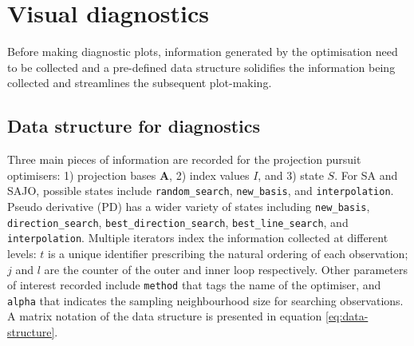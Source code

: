 \hypertarget{vis-diag}{%
\section{Visual diagnostics}\label{vis-diag}}

Before making diagnostic plots, information generated by the
optimisation need to be collected and a pre-defined data structure
solidifies the information being collected and streamlines the
subsequent plot-making.

\hypertarget{data-structure-for-diagnostics}{%
\subsection{Data structure for
diagnostics}\label{data-structure-for-diagnostics}}

Three main pieces of information are recorded for the projection pursuit
optimisers: 1) projection bases \(\mathbf{A}\), 2) index values \(I\),
and 3) state \(S\). For SA and SAJO, possible states include
\texttt{random\_search}, \texttt{new\_basis}, and
\texttt{interpolation}. Pseudo derivative (PD) has a wider variety of
states including \texttt{new\_basis}, \texttt{direction\_search},
\texttt{best\_direction\_search}, \texttt{best\_line\_search}, and
\texttt{interpolation}. Multiple iterators index the information
collected at different levels: \(t\) is a unique identifier prescribing
the natural ordering of each observation; \(j\) and \(l\) are the
counter of the outer and inner loop respectively. Other parameters of
interest recorded include \texttt{method} that tags the name of the
optimiser, and \texttt{alpha} that indicates the sampling neighbourhood
size for searching observations. A matrix notation of the data structure
is presented in equation \ref{eq:data-structure}.

